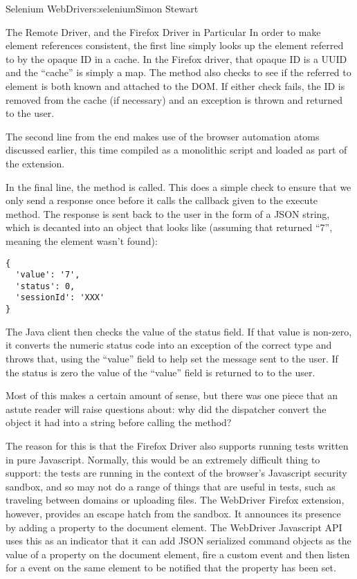 \begin{aosachapter}{Selenium WebDriver}{s:selenium}{Simon Stewart}
\begin{aosasect1}{The Remote Driver, and the Firefox Driver in Particular}
\noindent In order to make element references consistent, the first line simply
looks up the element referred to by the opaque ID in a cache. In the
Firefox driver, that opaque ID is a UUID and the ``cache'' is simply a
map.  The  method also checks to see if the
referred to element is both known and attached to the DOM\@. If either
check fails, the ID is removed from the cache (if necessary) and an
exception is thrown and returned to the user.

The second line from the end makes use of the browser automation atoms
discussed earlier, this time compiled as a monolithic script and
loaded as part of the extension.

In the final line, the  method is called.  This does a
simple check to ensure that we only send a response once before it
calls the callback given to the execute method. The response is sent
back to the user in the form of a JSON string, which is decanted into
an object that looks like (assuming that  returned
``7'', meaning the element wasn't found):

\begin{verbatim}
{
  'value': '7',
  'status': 0,
  'sessionId': 'XXX'
}
\end{verbatim}

The Java client then checks the value of the status field. If that
value is non-zero, it converts the numeric status code into an
exception of the correct type and throws that, using the ``value''
field to help set the message sent to the user. If the status is zero
the value of the ``value'' field is returned to to the user.

Most of this makes a certain amount of sense, but there was one piece
that an astute reader will raise questions about: why did the
dispatcher convert the object it had into a string before calling the
 method?

The reason for this is that the Firefox Driver also supports running
tests written in pure Javascript. Normally, this would be an extremely
difficult thing to support: the tests are running in the context of
the browser's Javascript security sandbox, and so may not do a range
of things that are useful in tests, such as traveling between domains
or uploading files. The WebDriver Firefox extension, however, provides
an escape hatch from the sandbox. It announces its presence by adding
a  property to the document element. The WebDriver
Javascript API uses this as an indicator that it can add JSON
serialized command objects as the value of a  property on
the document element, fire a custom  event and
then listen for a  event on the same element to
be notified that the  property has been set.


\end{aosasect1}
\end{aosachapter}
